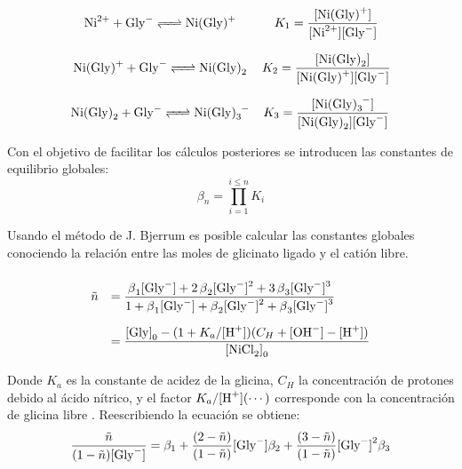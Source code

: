 \documentclass[fleqn,10pt]{SelfArx} %
\begin{document}
    \footnotesize
    \begin{equation*}
        \begin{array}{cc}
        \ce{Ni^{2+} + Gly- <=> Ni(Gly)+} & K_1 = \dfrac{\ce{[Ni(Gly)+]}}{\ce{[Ni^{2+}][Gly^-]}}\\
        \ce{Ni(Gly)+ + Gly- <=> Ni(Gly)_2} & K_2 = \dfrac{\ce{[Ni(Gly)_2]}}{\ce{[Ni(Gly)+][Gly^-]}}\\
        \ce{Ni(Gly)_2 + Gly- <=> Ni(Gly)_3-} & K_3 = \dfrac{\ce{[Ni(Gly)_3^-]}}{\ce{[Ni(Gly)_2][Gly^-]}}
        \end{array}
    \end{equation*}
    \normalsize
    
    Con el objetivo de facilitar los c\'alculos posteriores se introducen las constantes de equilibrio globales:
    \begin{equation}
	    \beta_n = \prod\limits_{i=1}^{i \leq n} K_i
    \end{equation}
    
    Usando el m\'etodo de J. Bjerrum es posible calcular las constantes globales conociendo la relaci\'on entre las moles de glicinato ligado y el cati\'on libre.
    \small  
    \begin{equation}
    \def\arraystretch{3}
	    \begin{array}{rl}
		    \tilde{n} & = \dfrac{\ce{\beta_1[Gly^-] + 2\beta_2[Gly^-]^2 + 3\beta_3[Gly^-]^3}}{\ce{1 + \beta_1[Gly^-] + \beta_2[Gly^-]^2 + \beta_3[Gly^-]^3}} \\
		    & = \dfrac{\ce{[Gly]}_0 - (1+K_a/\ce{[H+]})(C_H + \ce{[OH^-] - [H+]})}{\ce{[NiCl2]}_0}
	    \end{array}
    \end{equation}
    \normalsize
    
    Donde $K_a$ es la constante de acidez de la glicina, $C_H$ la concentraci\'on de protones debido al \'acido n\'itrico, y el factor $K_a/\ce{[H+]}(\cdots)$ corresponde con la concentraci\'on de glicina libre \ce{[Gly^-]}. Reescribiendo la ecuaci\'on se obtiene:
    \footnotesize
    \begin{equation}
	    \dfrac{\tilde{n}}{(1-\tilde{n})\ce{[Gly^-]}} = \beta_1 + \dfrac{(2-\tilde{n})}{(1-\tilde{n})}\ce{[Gly^-]}\beta_2 + \dfrac{(3-\tilde{n})}{(1-\tilde{n})}\ce{[Gly^-]}^2\beta_3
    \end{equation}
    \normalsize
    
\end{document}
